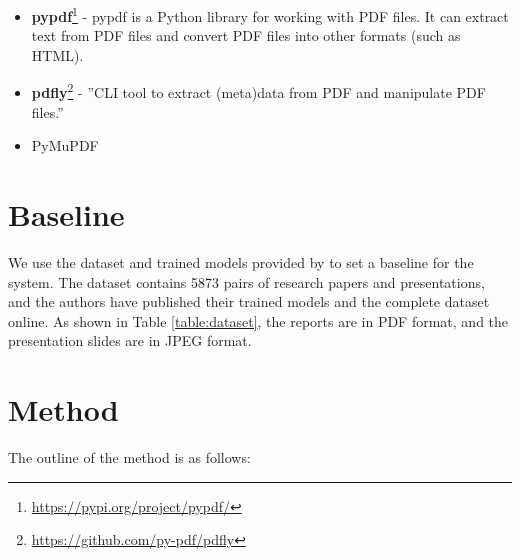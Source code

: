 \begin{itemize}
    \item \textbf{pypdf}\footnote{\url{https://pypi.org/project/pypdf/}} - pypdf is a Python library for working with PDF files. It can extract text from PDF files and convert PDF files into other formats (such as HTML).
    \item \textbf{pdfly}\footnote{\url{https://github.com/py-pdf/pdfly}} - ''CLI tool to extract (meta)data from PDF and manipulate PDF files.''
    \item PyMuPDF
\end{itemize}

\section{Baseline}
We use the dataset and trained models provided by \citet{Fu:2022:AAAI} to set a baseline for the system. The dataset contains 5873 pairs of research papers and presentations, and the authors have published their trained models and the complete dataset online. As shown in Table \ref{table:dataset}, the reports are in PDF format, and the presentation slides are in JPEG format. 

\section{Method}
The outline of the method is as follows:

